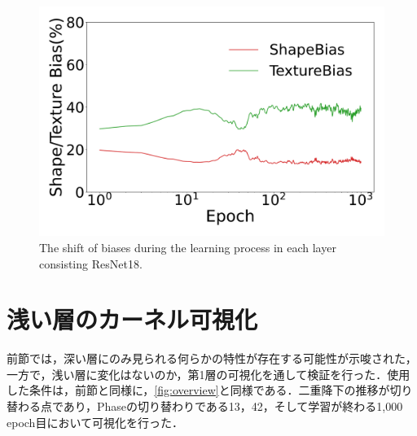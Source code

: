 \begin{figure}[h]
\begin{minipage}[b]{.48\linewidth}
  \end{minipage}
\begin{minipage}[b]{.48\linewidth}
    \centering
    \includegraphics[width=1\linewidth]{bias_fig/IN_ResNet18/layer17.pdf}
  \end{minipage}
\caption{
The shift of biases during the learning process in each layer consisting ResNet18. 
}
\label{fig:layer_ab}
\end{figure}

\newpage

\section{浅い層のカーネル可視化}
前節では，深い層にのみ見られる何らかの特性が存在する可能性が示唆された，一方で，浅い層に変化はないのか，第1層の可視化を通して検証を行った．使用した条件は，前節と同様に，\cref{fig:overview}と同様である．二重降下の推移が切り替わる点であり，Phaseの切り替わりである13，42，そして学習が終わる1,000 epoch目において可視化を行った．

